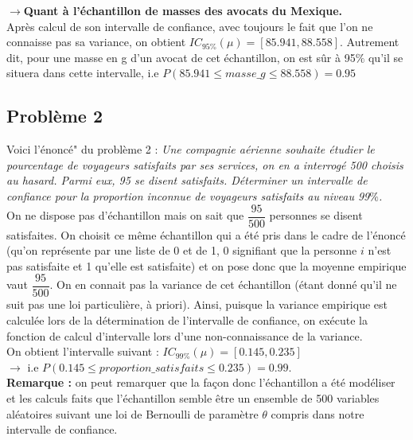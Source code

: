 \documentclass{article}      %
\begin{document}
$\rightarrow$\textbf{Quant à l'échantillon de masses des avocats du Mexique.}\\
Après calcul de son intervalle de confiance, avec toujours le fait que l'on ne connaisse pas sa variance, on obtient $IC_{95\%}(\mu) = [85.941, 88.558]$. Autrement dit, pour une masse en g d'un avocat de cet échantillon, on est sûr à 95$\%$ qu'il se situera dans cette intervalle, i.e $P(85.941 \le masse\_g \le 88.558) = 0.95$

\subsection{Problème 2}
Voici l'énoncé" du problème 2 : \textit{Une compagnie aérienne souhaite étudier le pourcentage de voyageurs satisfaits par ses services, on en a interrogé 500 choisis au hasard. Parmi eux, 95
se disent satisfaits. Déterminer un intervalle de confiance pour la proportion
inconnue de voyageurs satisfaits au niveau 99$\%$.}\\

On ne dispose pas d'échantillon mais on sait que $\dfrac{95}{500}$ personnes se disent satisfaites. On choisit ce même échantillon qui a été pris dans le cadre de l'énoncé (qu'on représente par une liste de 0 et de 1, 0 signifiant que la personne $i$ n'est pas satisfaite et 1 qu'elle est satisfaite) et on pose donc que la moyenne empirique vaut $\dfrac{95}{500}$. On en connait pas la variance de cet échantillon (étant donné qu'il ne suit pas une loi particulière, à priori). Ainsi, puisque la variance empirique est calculée lors de la détermination de l'intervalle de confiance, on exécute la fonction de calcul d'intervalle lors d'une non-connaissance de la variance.\\
On obtient l'intervalle suivant : $IC_{99\%}(\mu) = [0.145, 0.235]$ \\$\rightarrow$ i.e $P(0.145 \le proportion\_satisfaits \le 0.235) = 0.99$.\\

\textbf{Remarque :} on peut remarquer que la façon donc l'échantillon a été modéliser et les calculs faits que l'échantillon semble être un ensemble de 500 variables aléatoires suivant une loi de Bernoulli de paramètre $\theta$ compris dans notre intervalle de confiance.
\end{document}
